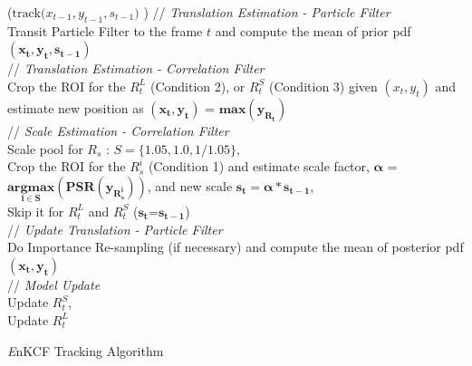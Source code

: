 \documentclass{bmvc2k}
\begin{document}
\begin{algorithm}[h]
\small
\DontPrintSemicolon
{}
\Begin($\text{track($x_{t-1},y_{t-1},s_{t-1}$) }$)
{
 	// \textit{Translation Estimation - Particle Filter} \\
	Transit Particle Filter to the frame $t$ and compute the mean of prior pdf $\mathbf{(x_{t},y_{t},s_{t-1})}$ \\
     // \textit{Translation Estimation - Correlation Filter} \\
	Crop the ROI for the $R_{t}^{L}$ (Condition 2), or $R_{t}^{S}$ (Condition 3) given $(x_{t},y_{t})$ and estimate new position as $\mathbf{(x_{t},y_{t})}$ = $\mathbf{max(y_{R_{t}})}$\\
	// \textit{Scale Estimation - Correlation Filter}\\
	Scale pool for $R_{s}$ : $S = \lbrace1.05,1.0,1/1.05\rbrace$,\\
	Crop the ROI for the $R_{s}^{i}$ (Condition 1) and estimate scale factor, $\mathbf{\alpha}$ = $\mathbf{\underset{i\in S}{argmax}(PSR(y_{R_{s}^{i}}))}$, and new scale $\mathbf{s_{t} = \alpha * s_{t-1}}$,\\ 
	Skip it for $R_{t}^{L}$ and $R_{t}^{S}$ ($\mathbf{s_{t}}$=$\mathbf{s_{t-1}}$)\\
	// \textit{Update Translation - Particle Filter}\\
	Do Importance Re-sampling (if necessary) and compute the 
	mean of posterior pdf $\mathbf{(x_{t},y_{t})}$\\
	// \textit{Model Update}\\
	Update $R_{t}^{S}$,\\
	Update $R_{t}^{L}$\\
  \label{endfor}
}
\caption{{\it E}nKCF Tracking Algorithm}\label{alg:MKCF}
\end{algorithm}
\end{document}
